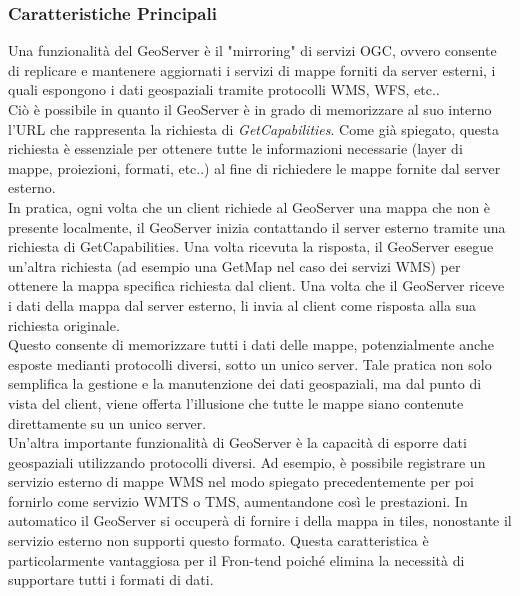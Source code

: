 \subsubsection{Caratteristiche Principali}

Una funzionalità del GeoServer è il "mirroring" di servizi OGC, ovvero consente di replicare e mantenere aggiornati i servizi di mappe forniti da server esterni, i quali espongono i dati geospaziali tramite protocolli WMS, WFS, etc..
\\Ciò è possibile in quanto il GeoServer è in grado di memorizzare al suo interno l'URL che rappresenta la richiesta di \textit{GetCapabilities}. Come già spiegato, questa richiesta è essenziale per ottenere tutte le informazioni necessarie (layer di mappe, proiezioni, formati, etc..) al fine di richiedere le mappe fornite dal server esterno.
\\In pratica, ogni volta che un client richiede al GeoServer una mappa che non è presente localmente, il GeoServer inizia contattando il server esterno tramite una richiesta di GetCapabilities. Una volta ricevuta la risposta, il GeoServer esegue un'altra richiesta (ad esempio una GetMap nel caso dei servizi WMS) per ottenere la mappa specifica richiesta dal client. Una volta che il GeoServer riceve i dati della mappa dal server esterno, li invia al client come risposta alla sua richiesta originale.
\\Questo consente di memorizzare tutti i dati delle mappe, potenzialmente anche esposte medianti protocolli diversi, sotto un unico server. Tale pratica non solo semplifica la gestione e la manutenzione dei dati geospaziali, ma dal punto di vista del client, viene offerta l'illusione che tutte le mappe siano contenute direttamente su un unico server.
\\Un'altra importante funzionalità di GeoServer è la capacità di esporre dati geospaziali utilizzando protocolli diversi. Ad esempio, è possibile registrare un servizio esterno di mappe WMS nel modo spiegato precedentemente per poi fornirlo come servizio WMTS o TMS, aumentandone così le prestazioni. In automatico il GeoServer si occuperà di fornire i della mappa in tiles, nonostante il servizio esterno non supporti questo formato. Questa caratteristica è particolarmente vantaggiosa per il Fron-tend poiché elimina la necessità di supportare tutti i formati di dati.

